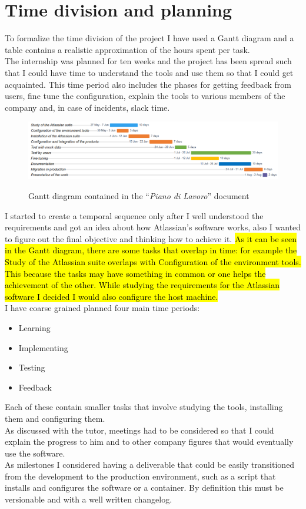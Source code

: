 \section{Time division and planning}
	To formalize the time division of the project I have used a Gantt diagram and a table contains a realistic approximation of the hours spent per task.\\
	The internship was planned for ten weeks and the project has been spread such that I could have time to understand the tools and use them so that I could get acquainted.
	This time period also includes the phases for getting feedback from users, fine tune the configuration, explain the tools to various members of the company and, in case of incidents, slack time.\\
	\begin{figure}[H]
		\centering
		\includegraphics[width=\textwidth]{resources/work_plan_gantt}\\
		\caption{Gantt diagram contained in the ``\textit{Piano di Lavoro}'' document}
	\end{figure}
	I started to create a temporal sequence only after I well understood the requirements and got an idea about how Atlassian's software works, also I wanted to figure out the final objective and thinking how to achieve it.
	\hl{As it can be seen in the Gantt diagram, there are some tasks that overlap in time: for example the Study of the Atlassian suite overlaps with Configuration of the environment tools.
	This because the tasks may have something in common or one helps the achievement of the other.
	While studying the requirements for the Atlassian software I decided I would also configure the host machine.}\\
	I have coarse grained planned four main time periods:
	\begin{itemize}
		\item Learning
		\item Implementing
		\item Testing
		\item Feedback
	\end{itemize}
	Each of these contain smaller tasks that involve studying the tools, installing them and configuring them.\\
	As discussed with the tutor, meetings had to be considered so that I could explain the progress to him and to other company figures that would eventually use the software.\\
	As milestones I considered having a deliverable that could be easily transitioned from the development to the production environment, such as a script that installs and configures the software or a container.
	By definition this must be versionable and with a well written changelog.
	
	